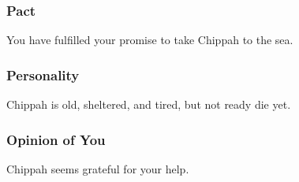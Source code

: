 \documentclass[letterpaper,10pt,twoside,twocolumn,openany]{book}
\begin{document}
\subsubsection{Pact}
You have fulfilled your promise to take Chippah to the sea.

\subsubsection{Personality}
Chippah is old, sheltered, and tired, but not ready die yet.

\subsubsection{Opinion of You}
Chippah seems grateful for your help.




\end{document}
